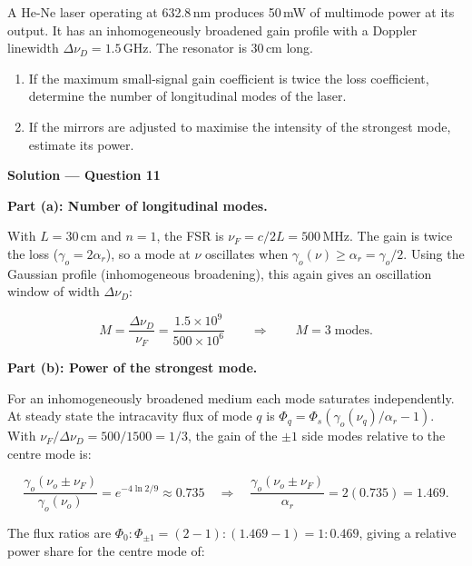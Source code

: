 
\begin{question}[Question 11]A He-Ne laser operating at 632.8\,nm produces 50\,mW of multimode power
at its output. It has an inhomogeneously broadened gain profile with a Doppler linewidth
$\Delta\nu_{D}=1.5$\,GHz. The resonator is 30\,cm long.
\begin{enumerate}[label=(\alph*)]
  \item If the maximum small-signal gain coefficient is twice the loss coefficient, determine
        the number of longitudinal modes of the laser.
  \item If the mirrors are adjusted to maximise the intensity of the strongest mode, estimate
        its power.
\end{enumerate}
\end{question}

\textbf{\large Solution --- Question 11}

\textbf{Part (a): Number of longitudinal modes.}

With $L = 30$\,cm and $n=1$, the FSR is $\nu_F = c/2L = 500$\,MHz. The gain is twice the loss ($\gamma_o = 2\alpha_r$), so a mode at $\nu$ oscillates when $\gamma_o(\nu) \ge \alpha_r = \gamma_o/2$. Using the Gaussian profile (inhomogeneous broadening), this again gives an oscillation window of width $\Delta\nu_D$:

\begin{equation*}
  M = \frac{\Delta\nu_D}{\nu_F} = \frac{1.5\times10^{9}}{500\times10^{6}} \qquad\Longrightarrow\qquad \boxed{M = 3\;\text{modes}.}
\end{equation*}

\textbf{Part (b): Power of the strongest mode.}

For an inhomogeneously broadened medium each mode saturates independently. At steady state the intracavity flux of mode $q$ is $\Phi_q = \Phi_s(\gamma_o(\nu_q)/\alpha_r - 1)$. With $\nu_F/\Delta\nu_D = 500/1500 = 1/3$, the gain of the $\pm 1$ side modes relative to the centre mode is:

\begin{equation*}
  \frac{\gamma_o(\nu_o \pm \nu_F)}{\gamma_o(\nu_o)} = e^{-4\ln2/9} \approx 0.735
  \quad\Longrightarrow\quad \frac{\gamma_o(\nu_o \pm \nu_F)}{\alpha_r} = 2(0.735) = 1.469.
\end{equation*}

The flux ratios are $\Phi_0 : \Phi_{\pm1} = (2-1) : (1.469-1) = 1 : 0.469$, giving a relative power share for the centre mode of:

